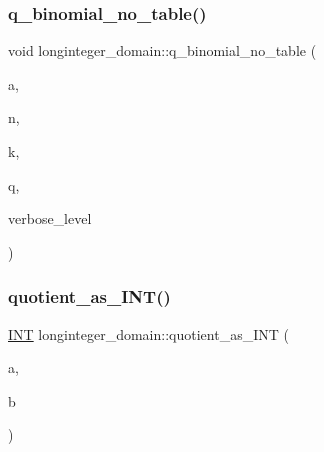 \mbox{\label{classlonginteger__domain_a2e84c4789cedf65f616992c323a7f610}} 
\subsubsection{\texorpdfstring{q\+\_\+binomial\+\_\+no\+\_\+table()}{q\_binomial\_no\_table()}}
{\footnotesize\ttfamily void longinteger\+\_\+domain\+::q\+\_\+binomial\+\_\+no\+\_\+table (\begin{DoxyParamCaption}\item[{\mbox{\hyperlink{classlonginteger__object}{longinteger\+\_\+object}} \&}]{a,  }\item[{\mbox{\hyperlink{galois_8h_a09fddde158a3a20bd2dcadb609de11dc}{I\+NT}}}]{n,  }\item[{\mbox{\hyperlink{galois_8h_a09fddde158a3a20bd2dcadb609de11dc}{I\+NT}}}]{k,  }\item[{\mbox{\hyperlink{galois_8h_a09fddde158a3a20bd2dcadb609de11dc}{I\+NT}}}]{q,  }\item[{\mbox{\hyperlink{galois_8h_a09fddde158a3a20bd2dcadb609de11dc}{I\+NT}}}]{verbose\+\_\+level }\end{DoxyParamCaption})}

\mbox{\label{classlonginteger__domain_ab619f70e755ae7b191a9ea46f73baa5e}} 
\subsubsection{\texorpdfstring{quotient\+\_\+as\+\_\+\+I\+N\+T()}{quotient\_as\_INT()}}
{\footnotesize\ttfamily \mbox{\hyperlink{galois_8h_a09fddde158a3a20bd2dcadb609de11dc}{I\+NT}} longinteger\+\_\+domain\+::quotient\+\_\+as\+\_\+\+I\+NT (\begin{DoxyParamCaption}\item[{\mbox{\hyperlink{classlonginteger__object}{longinteger\+\_\+object}} \&}]{a,  }\item[{\mbox{\hyperlink{classlonginteger__object}{longinteger\+\_\+object}} \&}]{b }\end{DoxyParamCaption})}

